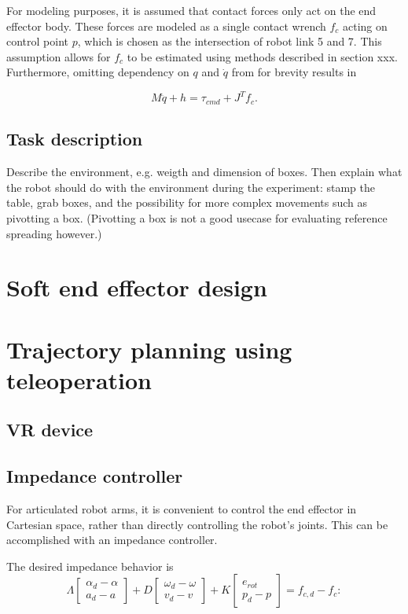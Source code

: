 \documentclass[a4paper, 10pt, conference]{ieeeconf}
\begin{document}
    For modeling purposes, it is assumed that contact forces only act on the end effector body. These forces are modeled as a single contact wrench $f_c$ acting on control point $p$, which is chosen as the intersection of robot link 5 and 7. This assumption allows for $f_c$ to be estimated using methods described in section xxx. Furthermore, omitting dependency on $q$ and $\dot{q}$ from for brevity results in

    \begin{equation}
    M\ddot{q}+h=\tau_{cmd}+J^Tf_c.
    \end{equation}

\subsection{Task description}
Describe the environment, e.g. weigth and dimension of boxes. Then explain what the robot should do with the environment during the experiment: stamp the table, grab boxes, and the possibility for more complex movements such as pivotting a box. (Pivotting a box is not a good usecase for evaluating reference spreading however.)
    \section{Soft end effector design}
    \section{Trajectory planning using teleoperation}
    \subsection{VR device}
    \subsection{Impedance controller}
    For articulated robot arms, it is convenient to control the end effector in Cartesian space, rather than directly controlling the robot's joints. This can be accomplished with an impedance controller.

    The desired impedance behavior is
    \begin{equation} \label{eq:impedance_desired}
     \Lambda  \begin{bmatrix} \alpha_d - \alpha   \\ a_d - a  \end{bmatrix} + D \begin{bmatrix} \omega_d - {\omega} \\ v_d - v \end{bmatrix}  + K \begin{bmatrix} e_{rot} \\p_d - {p}  \end{bmatrix} = {f_{c,d}} -f_c:
     \end{equation} 
\end{document}
